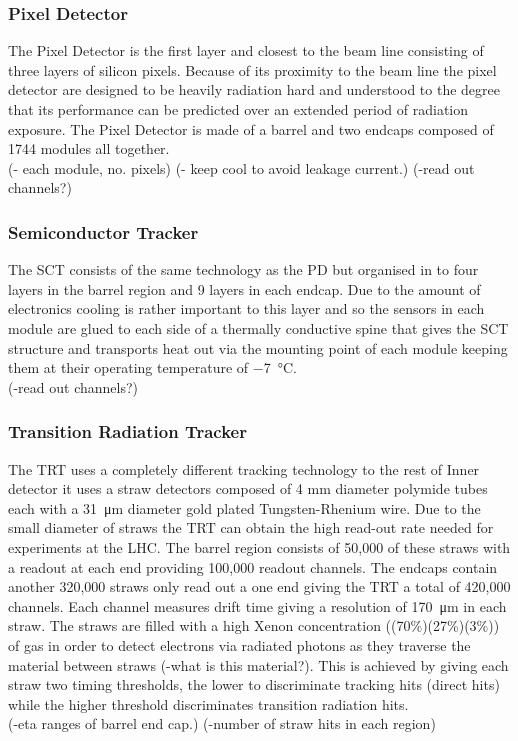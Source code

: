 		\subsubsection*{Pixel Detector} 

		The Pixel Detector is the first layer and closest to the beam line consisting of three layers of silicon pixels. Because of its proximity to the beam line the pixel detector are designed to be heavily radiation hard and understood to the degree that its performance can be predicted over an extended period of radiation exposure. The Pixel Detector is made of a barrel and two endcaps composed of 1744 modules all together. \\
		(- each module, no. pixels)
		(- keep cool to avoid leakage current.)
		(-read out channels?)


		\subsubsection*{Semiconductor Tracker}

		The SCT consists of the same technology as the PD but organised in to four layers in the barrel region and 9 layers in each endcap. Due to the amount of electronics cooling is rather important to this layer and so the sensors in each module are glued to each side of a thermally conductive spine that gives the SCT structure and transports heat out via the mounting point of each module keeping them at their operating temperature of \SI{-7}{\degreeCelsius}.\\
		(-read out channels?)



		\subsubsection*{Transition Radiation Tracker}

		The TRT uses a completely different tracking technology to the rest of Inner detector it uses a straw detectors composed of 4 mm diameter polymide tubes each with a \SI{31}{\um} diameter gold plated Tungsten-Rhenium wire. Due to the small diameter of straws the TRT can obtain the high read-out rate needed for experiments at the LHC. The barrel region consists of 50,000 of these straws with a readout at each end providing 100,000 readout channels. The endcaps contain another 320,000 straws only read out a one end giving the TRT a total of 420,000 channels. Each channel measures drift time giving a resolution of \SI{170}{\um} in each straw. The straws are filled with a high Xenon concentration ((70\%)(27\%)(3\%)) of gas in order to detect electrons via radiated photons as they traverse the material between straws (-what is this material?). This is achieved by giving each straw two timing thresholds, the lower to discriminate tracking hits (direct hits) while the higher threshold discriminates transition radiation hits. \\
		(-eta ranges of barrel end cap.)
		(-number of straw hits in each region) 
		




